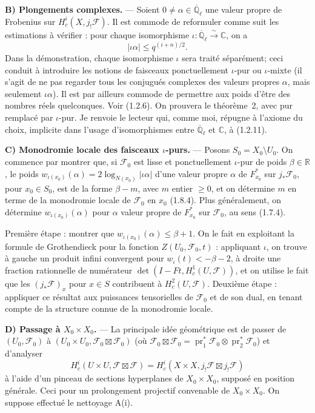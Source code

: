 \documentclass[12pt,a4paper]{article}
\theoremstyle{plain}
\theoremstyle{definition}
\theoremstyle{definition}
\theoremstyle{remark}
\DeclareMathOperator{\pr}{pr}
\begin{document}
\medskip
\textbf{B) Plongements complexes.} --- Soient $0 \neq \alpha \in \overline{\mathbb{Q}}_\ell$ une valeur propre de Frobenius sur $H_c^i(X, j_! \mathscr{F})$. Il est commode de reformuler comme suit les estimations \`a v\'erifier : pour chaque isomorphisme $\iota: \overline{\mathbb{Q}}_\ell \xrightarrow{\sim} \mathbb{C}$, on a
\[|\iota\alpha| \leq q^{(i+n)/2}.\]
Dans la d\'emonstration, chaque isomorphisme $\iota$ sera trait\'e s\'epar\'ement; ceci conduit \`a introduire les notions de faisceaux ponctuellement $\iota$-pur ou $\iota$-mixte (il s'agit de ne pas regarder tous les conjugu\'es complexes des valeurs propres $\alpha$, mais seulement $\iota\alpha$). Il est par ailleurs commode de permettre aux poids d'être des nombres r\'eels quelconques. Voir (1.2.6). On prouvera le th\'eor\`eme~2, avec pur remplac\'e par $\iota$-pur. Je renvoie le lecteur qui, comme moi, r\'epugne \`a l'axiome du choix, implicite dans l'usage d'isomorphismes entre $\overline{\mathbb{Q}}_\ell$ et $\mathbb{C}$, \`a (1.2.11).

\medskip
\textbf{C) Monodromie locale des faisceaux $\iota$-purs.} --- Posons $S_0 = X_0 \setminus U_0$. On commence par montrer que, si $\mathscr{F}_0$ est lisse et ponctuellement $\iota$-pur de poids $\beta \in \mathbb{R}$, le poids $w_{\iota(x_0)}(\alpha) = 2\log_{N(x_0)}|\iota\alpha|$ d'une valeur propre $\alpha$ de $F_{x_0}^*$ sur $j_* \mathscr{F}_0$, pour $x_0 \in S_0$, est de la forme $\beta - m$, avec $m$ entier $\geq 0$, et on d\'etermine $m$ en terme de la monodromie locale de $\mathscr{F}_0$ en $x_0$ (1.8.4). Plus g\'en\'eralement, on d\'etermine $w_{\iota(x_0)}(\alpha)$ pour $\alpha$ valeur propre de $F_{x_0}^*$ sur $\mathscr{F}_0$, au sens (1.7.4).

Premi\`ere \'etape : montrer que $w_{\iota(x_0)}(\alpha) \leq \beta + 1$. On le fait en exploitant la formule de Grothendieck pour la fonction $Z(U_0, \mathscr{F}_0, t)$ : appliquant $\iota$, on trouve \`a gauche un produit infini convergent pour $w_\iota(t) < -\beta - 2$, \`a droite une fraction rationnelle de num\'erateur $\det(I - Ft, H_c^1(U, \mathscr{F}))$, et on utilise le fait que les $(j_* \mathscr{F})_x$ pour $x \in S$ contribuent \`a $H_c^2(U, \mathscr{F})$. Deuxi\`eme \'etape : appliquer ce r\'esultat aux puissances tensorielles de $\mathscr{F}_0$ et de son dual, en tenant compte de la structure connue de la monodromie locale.

\medskip
\textbf{D) Passage \`a $X_0 \times X_0$.} --- La principale id\'ee g\'eom\'etrique est de passer de $(U_0, \mathscr{F}_0)$ \`a $(U_0 \times U_0, \mathscr{F}_0 \boxtimes \mathscr{F}_0)$ (o\`u $\mathscr{F}_0 \boxtimes \mathscr{F}_0 = \pr_1^* \mathscr{F}_0 \otimes \pr_2^* \mathscr{F}_0$) et d'analyser
\[H_c^i(U \times U, \mathscr{F} \boxtimes \mathscr{F}) = H_c^i(X \times X, j_! \mathscr{F} \boxtimes j_! \mathscr{F})\]
\`a l'aide d'un pinceau de sections hyperplanes de $X_0 \times X_0$, suppos\'e en position g\'en\'erale. Ceci pour un prolongement projectif convenable de $X_0 \times X_0$. On suppose effectu\'e le nettoyage A(i).
\end{document}
